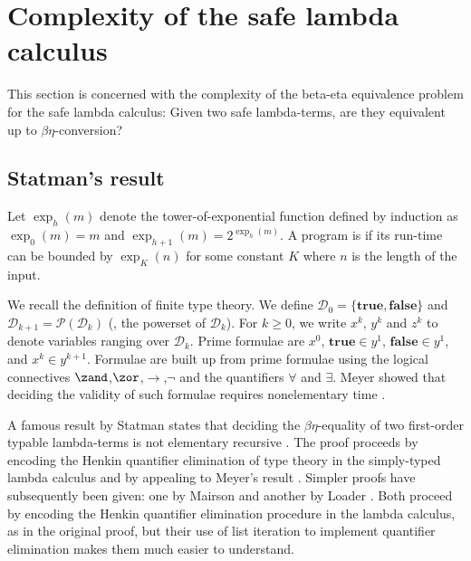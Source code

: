 \newcommand\bigo{\mathcal{O}} %
\newcommand\booltype{\mathsf{B}}
\newcommand\towerexp[2]{\exp_{#1}(#2)}

\section{Complexity of the safe lambda calculus}
This section is concerned with the complexity of the
beta-eta equivalence problem for the safe lambda calculus:
Given two safe lambda-terms, are they equivalent up to $\beta\eta$-conversion?

\subsection{Statman's result}

Let $\towerexp{h}{m}$ denote the tower-of-exponential function
defined by induction as $\towerexp{0}{m} = m$ and $\towerexp{h+1}{m} =
2^{\towerexp{h}{m}}$.
A program is  if its run-time can be bounded by
$\towerexp{K}{n}$ for some constant $K$ where $n$ is the length of
the input.

We recall the definition of finite type
theory. We define $\mathcal{D}_0 =
\{\mathbf{true},\mathbf{false}\}$ and $\mathcal{D}_{k+1}
=\mathscr{P}(\mathcal{D}_k)$ (\ie, the powerset of $\mathcal{D}_k$).
For $k\geq0$, we write $x^k$, $y^k$ and
$z^k$ to denote variables ranging over $\mathcal{D}_k$. Prime
formulae are $x^0$, $\mathbf{true}\in y^1$, $\mathbf{false}\in y^1$,
and  $x^k \in y^{k+1}$. Formulae are built up from prime formulae
using the logical connectives $\zand$,$\zor$,$\rightarrow$,$\neg$
and the quantifiers $\forall$ and $\exists$. Meyer showed that
deciding the validity of such formulae requires nonelementary time
\cite{Meyer1974}.


A famous result by Statman  states that deciding the
$\beta\eta$-equality of two first-order typable lambda-terms is not
elementary recursive \cite{Statman:1979:TLE}. The proof proceeds by
encoding the Henkin quantifier elimination of type theory in the
simply-typed lambda calculus and by appealing to Meyer's result \cite{Meyer1974}. Simpler proofs have subsequently been given: one by Mairson \cite{mairson1992spt} and another by Loader
\cite{Loader1998}. Both proceed by encoding the Henkin quantifier
elimination procedure in the lambda calculus, as in the original
proof, but their use of list iteration to implement quantifier
elimination makes them much easier to understand.

